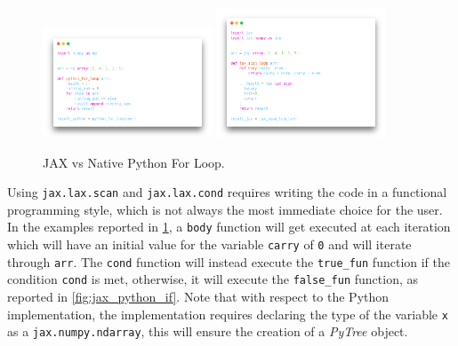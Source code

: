 \begin{figure}[h]
    \centering
    \caption{JAX vs Native Python For Loop.}
    \label{fig:jax_python_forloop}
    \includegraphics[width=0.45\textwidth]{Images/python_forloop.png}
    \includegraphics[width=0.45\textwidth]{Images/jax_forloop.png}
\end{figure}

Using \texttt{jax.lax.scan} and \texttt{jax.lax.cond} requires writing the code in a functional programming style, which is not always the most immediate choice for the user. In the examples reported in \cref{fig:jax_python_forloop}, a \texttt{body} function will get executed at each iteration which will have an initial value for the variable \texttt{carry} of \texttt{0} and will iterate through \texttt{arr}. The \texttt{cond} function will instead execute the \texttt{true\_fun} function if the condition \texttt{cond} is met, otherwise, it will execute the \texttt{false\_fun} function, as reported in \cref{fig:jax_python_if}. Note that with respect to the Python implementation, the \jax implementation requires declaring the type of the variable \texttt{x} as a \texttt{jax.numpy.ndarray}, this will ensure the creation of a \textit{PyTree} object.

